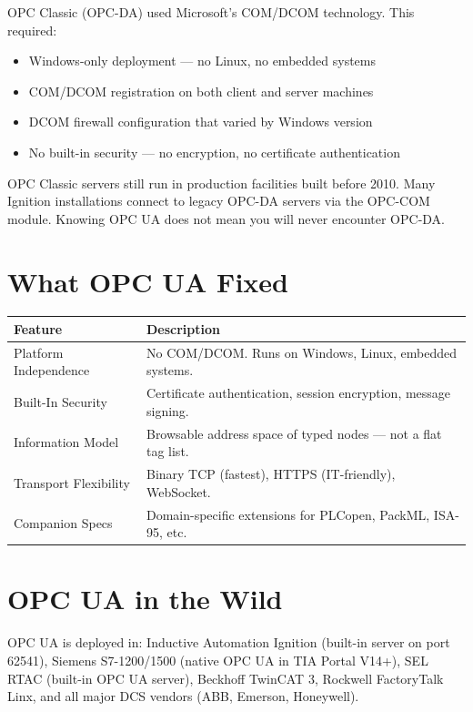 \documentclass[12pt,twoside,openright]{memoir}
\begin{document}
OPC Classic (OPC-DA) used Microsoft's COM/DCOM technology. This required:
\begin{itemize}
  \item Windows-only deployment --- no Linux, no embedded systems
  \item COM/DCOM registration on both client and server machines
  \item DCOM firewall configuration that varied by Windows version
  \item No built-in security --- no encryption, no certificate authentication
\end{itemize}

\begin{warningbox}
OPC Classic servers still run in production facilities built before 2010. Many Ignition installations connect
to legacy OPC-DA servers via the OPC-COM module. Knowing OPC UA does not mean you will never encounter OPC-DA.
\end{warningbox}

\section{What OPC UA Fixed}

\begin{tabularx}{\textwidth}{lX}
\toprule
\textbf{Feature} & \textbf{Description} \\
\midrule
\rowcolor{rowlight} Platform Independence & No COM/DCOM. Runs on Windows, Linux, embedded systems. \\
Built-In Security & Certificate authentication, session encryption, message signing. \\
\rowcolor{rowlight} Information Model & Browsable address space of typed nodes --- not a flat tag list. \\
Transport Flexibility & Binary TCP (fastest), HTTPS (IT-friendly), WebSocket. \\
\rowcolor{rowlight} Companion Specs & Domain-specific extensions for PLCopen, PackML, ISA-95, etc. \\
\bottomrule
\end{tabularx}

\section{OPC UA in the Wild}

OPC UA is deployed in: Inductive Automation Ignition (built-in server on port 62541), Siemens S7-1200/1500
(native OPC UA in TIA Portal V14+), SEL RTAC (built-in OPC UA server), Beckhoff TwinCAT 3, Rockwell FactoryTalk
Linx, and all major DCS vendors (ABB, Emerson, Honeywell).
\end{document}
